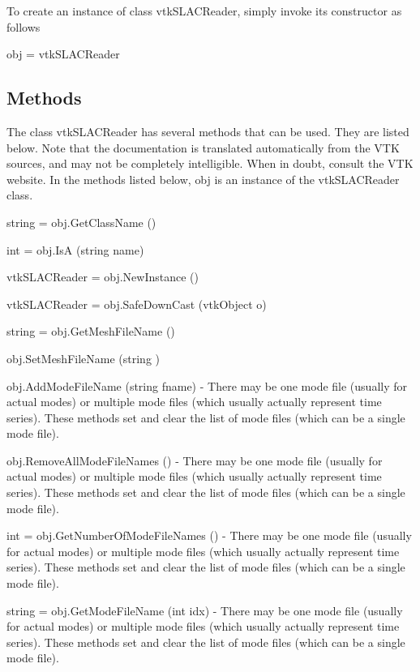To create an instance of class vtk\-S\-L\-A\-C\-Reader, simply invoke its constructor as follows \begin{DoxyVerb}  obj = vtkSLACReader
\end{DoxyVerb}
 \hypertarget{vtkwidgets_vtkxyplotwidget_Methods}{}\subsection{Methods}\label{vtkwidgets_vtkxyplotwidget_Methods}
The class vtk\-S\-L\-A\-C\-Reader has several methods that can be used. They are listed below. Note that the documentation is translated automatically from the V\-T\-K sources, and may not be completely intelligible. When in doubt, consult the V\-T\-K website. In the methods listed below, {\ttfamily obj} is an instance of the vtk\-S\-L\-A\-C\-Reader class. 
\begin{DoxyItemize}
\item {\ttfamily string = obj.\-Get\-Class\-Name ()}  
\item {\ttfamily int = obj.\-Is\-A (string name)}  
\item {\ttfamily vtk\-S\-L\-A\-C\-Reader = obj.\-New\-Instance ()}  
\item {\ttfamily vtk\-S\-L\-A\-C\-Reader = obj.\-Safe\-Down\-Cast (vtk\-Object o)}  
\item {\ttfamily string = obj.\-Get\-Mesh\-File\-Name ()}  
\item {\ttfamily obj.\-Set\-Mesh\-File\-Name (string )}  
\item {\ttfamily obj.\-Add\-Mode\-File\-Name (string fname)} -\/ There may be one mode file (usually for actual modes) or multiple mode files (which usually actually represent time series). These methods set and clear the list of mode files (which can be a single mode file).  
\item {\ttfamily obj.\-Remove\-All\-Mode\-File\-Names ()} -\/ There may be one mode file (usually for actual modes) or multiple mode files (which usually actually represent time series). These methods set and clear the list of mode files (which can be a single mode file).  
\item {\ttfamily int = obj.\-Get\-Number\-Of\-Mode\-File\-Names ()} -\/ There may be one mode file (usually for actual modes) or multiple mode files (which usually actually represent time series). These methods set and clear the list of mode files (which can be a single mode file).  
\item {\ttfamily string = obj.\-Get\-Mode\-File\-Name (int idx)} -\/ There may be one mode file (usually for actual modes) or multiple mode files (which usually actually represent time series). These methods set and clear the list of mode files (which can be a single mode file).  

\end{DoxyItemize}
